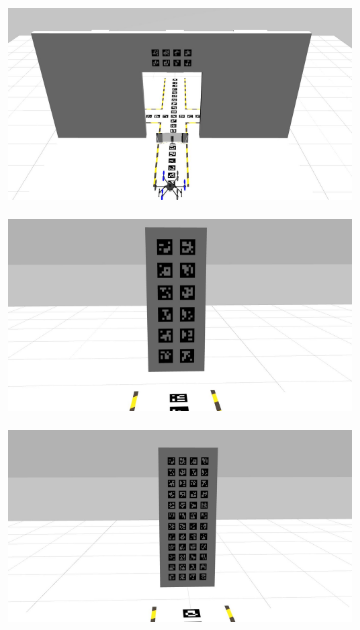 \documentclass[../Head/report.tex]{subfiles}
\begin{document}
\begin{figure}[H]
    \centering
    \begin{subfigure}[t]{.22\textwidth}
        \centering
        \includegraphics[width=\textwidth]{../Figures/3d-modeling/gazebo_gps2vision_board.jpg}
        \caption{}
        \label{fig:gazebo_gps2vision_board}
    \end{subfigure}
     \hspace{0.2em}
    \begin{subfigure}[t]{.22\textwidth}
        \centering
        \includegraphics[width=\textwidth]{../Figures/3d-modeling/gazebo_landing_board_one.jpg}
        \caption{}
        \label{fig:gazebo_landing_board_one}
    \end{subfigure}
     \hspace{0.2em}
    \begin{subfigure}[t]{.22\textwidth}
        \centering
        \includegraphics[width=\textwidth]{../Figures/3d-modeling/gazebo_landing_board_two.jpg}

\end{subfigure}
\end{figure}
\end{document}
